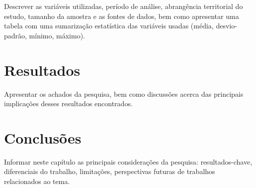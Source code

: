 Descrever as variáveis utilizadas, período de análise, abrangência territorial do estudo, tamanho da amostra e as fontes de dados, bem como apresentar uma tabela com uma sumarização estatística das variáveis usadas (média, desvio-padrão, mínimo, máximo).

\chapter{Resultados}

Apresentar os achados da pesquisa, bem como discussões acerca das principais implicações desses resultados encontrados.

\chapter{Conclusões}

Informar neste capítulo as principais considerações da pesquisa: resultados-chave, diferenciais do trabalho, limitações, perspectivas futuras de trabalhos relacionados ao tema.

\postextual



